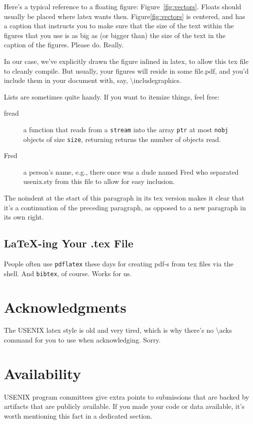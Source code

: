 \documentclass[letterpaper,twocolumn]{article}
\begin{document}
Here's a typical reference to a floating figure:
Figure~\ref{fig:vectors}. Floats should usually be placed where latex
wants then. Figure\ref{fig:vectors} is centered, and has a caption
that instructs you to make sure that the size of the text within the
figures that you use is as big as (or bigger than) the size of the
text in the caption of the figures. Please do. Really.

In our case, we've explicitly drawn the figure inlined in latex, to
allow this tex file to cleanly compile. But usually, your figures will
reside in some file.pdf, and you'd include them in your document
with, say, \textbackslash{}includegraphics.

Lists are sometimes quite handy. If you want to itemize things, feel
free:

\begin{description}
  
\item[fread] a function that reads from a \texttt{stream} into the
  array \texttt{ptr} at most \texttt{nobj} objects of size
  \texttt{size}, returning returns the number of objects read.

\item[Fred] a person's name, e.g., there once was a dude named Fred
  who separated usenix.sty from this file to allow for easy
  inclusion.
\end{description}

\noindent
The noindent at the start of this paragraph in its tex version makes
it clear that it's a continuation of the preceding paragraph, as
opposed to a new paragraph in its own right.

\subsection{LaTeX-ing Your .tex File}
People often use \texttt{pdflatex} these days for creating pdf-s from
tex files via the shell. And \texttt{bibtex}, of course. Works for us.

\section*{Acknowledgments}
The USENIX latex style is old and very tired, which is why
there's no \textbackslash{}acks command for you to use when
acknowledging. Sorry.

\section*{Availability}
USENIX program committees give extra points to submissions that are
backed by artifacts that are publicly available. If you made your code
or data available, it's worth mentioning this fact in a dedicated
section.



\end{document}
